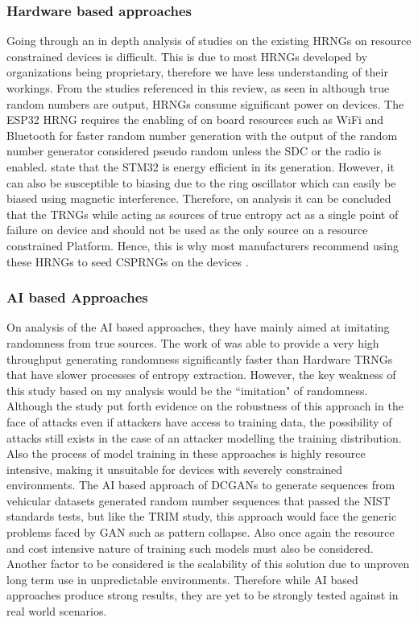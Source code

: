 \documentclass[a4paper, 12pt]{article}
\begin{document}
\subsubsection{Hardware based approaches}
Going through an in depth analysis of studies on the existing \ac{HRNG}s on resource constrained devices is difficult. This is due to most \ac{HRNG}s developed by organizations being proprietary, therefore we have less understanding of their workings. From the studies referenced in this review, as seen in \citet{espressif_esp32_trm_5_6} although true random numbers are output, \ac{HRNG}s consume significant power on devices. The ESP32 \ac{HRNG} \citep{espressif_esp32_trm_5_6} requires the enabling of on board resources such as WiFi and Bluetooth for faster random number generation with the output of the random number generator considered pseudo random unless the SDC or the radio is enabled. \citet{kietzmann2020prng} state that the STM32 is energy efficient in its generation. However, it can also be susceptible to biasing due to the ring oscillator which can easily be biased using magnetic interference. Therefore, on analysis it can be concluded that the \ac{TRNG}s while acting as sources of true entropy act as a single point of failure on device and should not be used as the only source on a resource constrained Platform. Hence, this is why most manufacturers recommend using these \ac{HRNG}s to seed \ac{CSPRNG}s on the devices \citep{nxp_mcuxpresso}.  \\

\subsubsection{AI based Approaches}
On analysis of the AI based approaches, they have mainly aimed at imitating randomness from true sources. The work of \cite{TRIM_RNG} was able to provide a very high throughput generating randomness significantly faster than Hardware \ac{TRNG}s  that have slower processes of entropy extraction. However, the key weakness of this study based on my analysis would be the ``imitation" of randomness. Although the study put forth evidence on the robustness of this approach in the face of attacks even if attackers have access to training data, the possibility of attacks still exists in the case of an attacker modelling the training distribution. Also the process of model training in these approaches is highly resource intensive, making it unsuitable for devices with severely constrained environments. The AI based approach of \ac{DCGAN}s to generate sequences from vehicular datasets \citep{Fei2025EPRNG} generated random number sequences that passed the \ac{NIST} standards tests, but like the \ac{TRIM} study, this approach would face the generic problems faced by \ac{GAN} such as pattern collapse. Also once again the resource and cost intensive nature of training such models must also be considered. Another factor to be considered is the scalability of this solution due to unproven long term use in unpredictable environments. Therefore while AI based approaches produce strong results, they are yet to be strongly tested against in real world scenarios. 
\end{document}
